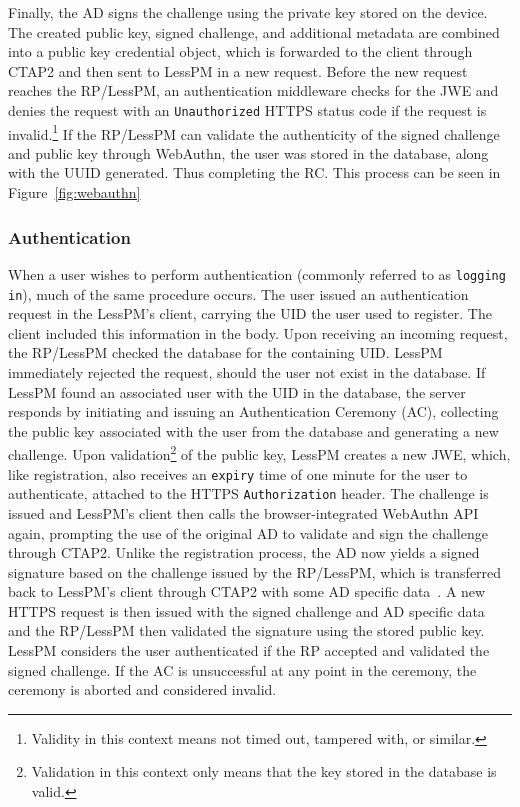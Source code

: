 Finally, the AD signs the challenge using the private key stored on the
device.
The created public key, signed challenge, and additional metadata are combined
into a public key credential object, which is forwarded to the client
through CTAP2 and then sent to LessPM in a new request.
Before the new request reaches the RP/LessPM, an authentication middleware
checks for the JWE and denies the request with an \texttt{Unauthorized} HTTPS
status code if the request is invalid.\footnote{
  Validity in this context means not timed out, tampered with, or similar.
}
If the RP/LessPM can validate the authenticity of the signed challenge and
public key through WebAuthn, the user was stored in the database, along with the
UUID generated.
Thus completing the RC\@.
This process can be seen in Figure~\ref{fig:webauthn}


\subsubsection{Authentication}\label{subsubsec:metho-authentication}
When a user wishes to perform authentication (commonly referred to as
\texttt{logging in}), much of the same procedure occurs.
The user issued an authentication request in the LessPM's client, carrying
the UID the user used to register.
The client included this information in the body.
Upon receiving an incoming request, the RP/LessPM checked the database for
the containing UID\@.
LessPM immediately rejected the request, should the user not exist in the
database.
If LessPM found an associated user with the UID in the database, the server
responds by initiating and issuing an Authentication Ceremony (AC),
collecting the public key associated with the user from the database and
generating a new challenge.
Upon validation\footnote{
  Validation in this context only means that the key stored in the database
  is valid.
} of the public key, LessPM creates a new JWE, which, like registration, also
receives an \texttt{expiry} time of one minute for the user to authenticate,
attached to the HTTPS \texttt{Authorization} header.
The challenge is issued and LessPM's client then calls the
browser-integrated WebAuthn API again, prompting the use of the original AD
to validate and sign the challenge through CTAP2.
Unlike the registration process, the AD now yields a signed signature based
on the challenge issued by the RP/LessPM\@, which is transferred back to
LessPM's client through CTAP2 with some AD specific
data~\cite{webauthn_authenticator_data}.
A new HTTPS request is then issued with the signed challenge and AD specific
data and the RP/LessPM then validated the signature using the stored public
key.
LessPM considers the user authenticated if the RP accepted and validated the
signed challenge.
If the AC is unsuccessful at any point in the ceremony, the ceremony is
aborted and considered invalid.

